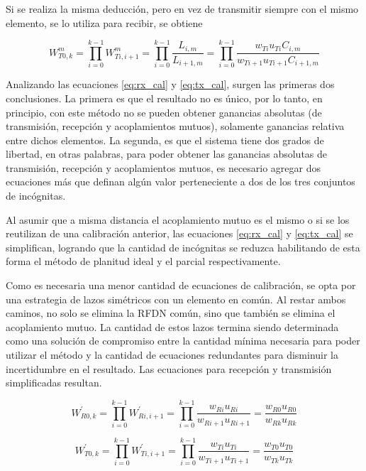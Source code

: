 Si se realiza la misma deducción, pero en vez de transmitir siempre con el mismo elemento, se lo utiliza para recibir, se obtiene

\begin{equation}
	W^{m}_{T0,k} = \prod_{i=0}^{k-1} W^{m}_{Ti,i+1} = \prod_{i=0}^{k-1}\dfrac{L_{i,m}}{L_{i+1, m}} =
		\prod_{i=0}^{k-1}\dfrac{w_{Ti} u_{Ti} C_{i,m}}{w_{Ti + 1} u_{Ti + 1}C_{i + 1, m}}
	\label{eq:tx_cal}
\end{equation}

Analizando las ecuaciones \ref{eq:rx_cal} y \ref{eq:tx_cal}, surgen las primeras dos conclusiones. La primera es que el
resultado no es único, por lo tanto, en principio, con este método no se pueden obtener ganancias absolutas (de transmisión,
recepción y acoplamientos mutuos), solamente ganancias relativa entre dichos elementos. La segunda, es que el sistema tiene
dos grados de libertad, en otras palabras, para poder obtener las ganancias absolutas de transmisión, recepción y acoplamientos
mutuos, es necesario agregar dos ecuaciones más que definan algún valor perteneciente a dos de los tres conjuntos de incógnitas.

Al asumir que a misma distancia el acoplamiento mutuo es el mismo o si se los reutilizan de una calibración anterior, las
ecuaciones \ref{eq:rx_cal} y \ref{eq:tx_cal} se simplifican, logrando que la cantidad de incógnitas se reduzca habilitando
de esta forma el método de planitud ideal y el parcial respectivamente.

Como es necesaria una menor cantidad de ecuaciones de calibración, se opta por una estrategia de lazos simétricos con un
elemento en común. Al restar ambos caminos, no solo se elimina la RFDN común, sino que también se elimina el
acoplamiento mutuo. La cantidad de estos lazos termina siendo determinada como una solución de compromiso entre la cantidad 
mínima necesaria para poder utilizar el método y la cantidad de ecuaciones redundantes para disminuir la incertidumbre en el
resultado. Las ecuaciones para recepción y transmisión simplificadas resultan.

\begin{equation}
	W^{'}_{R0,k} = \prod_{i=0}^{k-1} W^{'}_{Ri,i+1} = \prod_{i=0}^{k-1}\dfrac{w_{Ri} u_{Ri}}{w_{Ri + 1} u_{Ri + 1}} =
	\dfrac{w_{R0} u_{R0}}{w_{Rk} u_{Rk}}
	\label{eq:rx_simp_cal}
\end{equation}

\begin{equation}
	W^{'}_{T0,k} = \prod_{i=0}^{k-1} W^{'}_{Ti,i+1} = \prod_{i=0}^{k-1}\dfrac{w_{Ti} u_{Ti}}{w_{Ti + 1} u_{Ti + 1}} =
	\dfrac{w_{T0} u_{T0}}{w_{Tk} u_{Tk}}
	\label{eq:tx_simp_cal}
\end{equation}

